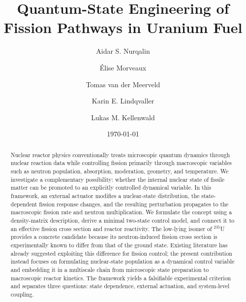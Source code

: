 \documentclass[
  aps,
  prc,
  reprint,
  superscriptaddress,
  nofootinbib
]{revtex4-2}
\begin{document}
\title{Quantum-State Engineering of Fission Pathways in Uranium Fuel}

\author{Aidar S. Nurqalin}

\author{Élise Morveaux}

\author{Tomas van der Meerveld}

\author{Karin E. Lindqvaller}

\author{Lukas M. Kellenwald}

\date{\today}

\begin{abstract}
Nuclear reactor physics conventionally treats microscopic quantum dynamics through nuclear reaction data while controlling fission primarily through macroscopic variables such as neutron population, absorption, moderation, geometry, and temperature. We investigate a complementary possibility: whether the internal nuclear state of fissile matter can be promoted to an explicitly controlled dynamical variable. In this framework, an external actuator modifies a nuclear-state distribution, the state-dependent fission response changes, and the resulting perturbation propagates to the macroscopic fission rate and neutron multiplication. We formulate the concept using a density-matrix description, derive a minimal two-state control model, and connect it to an effective fission cross section and reactor reactivity. The low-lying isomer of $^{235}$U provides a concrete candidate because its neutron-induced fission cross section is experimentally known to differ from that of the ground state. Existing literature has already suggested exploiting this difference for fission control; the present contribution instead focuses on formulating nuclear-state population as a dynamical control variable and embedding it in a multiscale chain from microscopic state preparation to macroscopic reactor kinetics. The framework yields a falsifiable experimental criterion and separates three questions: state dependence, external actuation, and system-level coupling.
\end{abstract}

\end{document}
